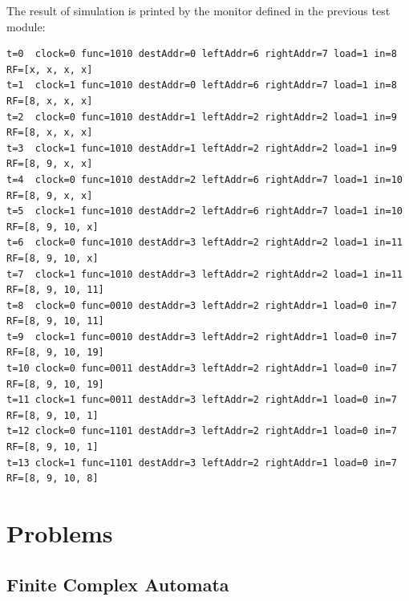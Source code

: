 The result of simulation is printed by the monitor defined in the previous test module:

{\footnotesize
\begin{verbatim}
t=0  clock=0 func=1010 destAddr=0 leftAddr=6 rightAddr=7 load=1 in=8  RF=[x, x, x, x]
t=1  clock=1 func=1010 destAddr=0 leftAddr=6 rightAddr=7 load=1 in=8  RF=[8, x, x, x]
t=2  clock=0 func=1010 destAddr=1 leftAddr=2 rightAddr=2 load=1 in=9  RF=[8, x, x, x]
t=3  clock=1 func=1010 destAddr=1 leftAddr=2 rightAddr=2 load=1 in=9  RF=[8, 9, x, x]
t=4  clock=0 func=1010 destAddr=2 leftAddr=6 rightAddr=7 load=1 in=10 RF=[8, 9, x, x]
t=5  clock=1 func=1010 destAddr=2 leftAddr=6 rightAddr=7 load=1 in=10 RF=[8, 9, 10, x]
t=6  clock=0 func=1010 destAddr=3 leftAddr=2 rightAddr=2 load=1 in=11 RF=[8, 9, 10, x]
t=7  clock=1 func=1010 destAddr=3 leftAddr=2 rightAddr=2 load=1 in=11 RF=[8, 9, 10, 11]
t=8  clock=0 func=0010 destAddr=3 leftAddr=2 rightAddr=1 load=0 in=7  RF=[8, 9, 10, 11]
t=9  clock=1 func=0010 destAddr=3 leftAddr=2 rightAddr=1 load=0 in=7  RF=[8, 9, 10, 19]
t=10 clock=0 func=0011 destAddr=3 leftAddr=2 rightAddr=1 load=0 in=7  RF=[8, 9, 10, 19]
t=11 clock=1 func=0011 destAddr=3 leftAddr=2 rightAddr=1 load=0 in=7  RF=[8, 9, 10, 1]
t=12 clock=0 func=1101 destAddr=3 leftAddr=2 rightAddr=1 load=0 in=7  RF=[8, 9, 10, 1]
t=13 clock=1 func=1101 destAddr=3 leftAddr=2 rightAddr=1 load=0 in=7  RF=[8, 9, 10, 8]
\end{verbatim}
}








\section{Problems}

\subsection{Finite Complex Automata}

